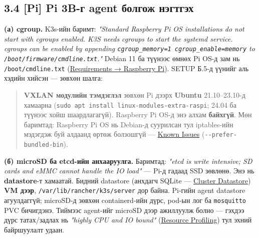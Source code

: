 \hypertarget{pi-pi-3b-ux433-agent-ux431ux43eux43bux433ux43eux436-ux43dux44dux433ux442ux433ux44dux445}{%
\subsection{3.4 {[}Pi{]} Pi 3B-г agent болгож нэгтгэх}\label{pi-pi-3b-ux433-agent-ux431ux43eux43bux433ux43eux436-ux43dux44dux433ux442ux433ux44dux445}}

\textbf{(а) cgroup.} K3s-ийн баримт: \emph{"Standard Raspberry Pi OS installations do not start with cgroups enabled. K3S needs cgroups to start the systemd service. cgroups can be enabled by appending \texttt{cgroup\_\allowbreak{}memory=\allowbreak{}1\ cgroup\_\allowbreak{}enable=\allowbreak{}memory} to \texttt{/\allowbreak{}boot/\allowbreak{}firmware/\allowbreak{}cmdline.\allowbreak{}txt}."} Debian 11 ба түүнээс өмнөх Pi OS-д зам нь \texttt{/\allowbreak{}boot/\allowbreak{}cmdline.\allowbreak{}txt} (\href{https://docs.k3s.io/installation/requirements\#operating-systems}{Requirements → Raspberry Pi}). SETUP Б.5-д үүнийг аль хэдийн хийсэн --- зөвхөн шалга:

\begin{Shaded}
\begin{Highlighting}[]
\end{Highlighting}
\end{Shaded}

\begin{quote}
\textbf{VXLAN модулийн тэмдэглэл} зөвхөн Pi дээрх \textbf{Ubuntu} 21.10--23.10-д хамаарна (\texttt{sudo\ apt\ install\ linux-modules-extra-raspi}; 24.04 ба түүнээс хойш шаардлагагүй). Raspberry Pi OS-д энэ алхам \textbf{байхгүй}. Мөн баримтад: Raspberry Pi OS нь Debian-д суурилсан тул iptables-ийн мэдэгдэж буй алдаанд өртөж болзошгүй --- \href{https://docs.k3s.io/known-issues}{Known Issues} (\texttt{-\/\allowbreak{}-prefer-bundled-bin}).
\end{quote}

\textbf{(б) microSD ба etcd-ийн анхааруулга.} Баримтад: \emph{"etcd is write intensive; SD cards and eMMC cannot handle the IO load"} --- Pi-д гадаад SSD зөвлөнө. Энэ нь \textbf{datastore}-т хамаатай. Бидний datastore (анхдагч SQLite --- \href{https://docs.k3s.io/datastore}{Cluster Datastore}) \textbf{VM дээр}, \texttt{/\allowbreak{}var/\allowbreak{}lib/\allowbreak{}rancher/\allowbreak{}k3s/\allowbreak{}server} дор байна. Pi-гийн agent datastore агуулдаггүй; microSD-д зөвхөн containerd-ийн дүрс, pod-ын лог ба \texttt{mosquitto} PVC бичигдэнэ. Тиймээс agent-ийг microSD дээр ажиллуулж болно --- гэхдээ дүрс татах/задлах нь \emph{"highly CPU and IO bound"} (\href{https://docs.k3s.io/reference/resource-profiling}{Resource Profiling}) тул эхний байршуулалт удаан.

